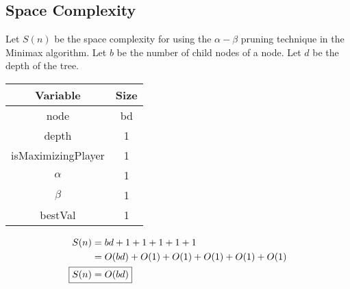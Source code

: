 \documentclass[12pt]{article}%
\begin{document}
  \subsection{Space Complexity \cite{cis}}
    Let $S(n)$ be the space complexity for using the $\alpha - \beta$ pruning technique in the Minimax algorithm. Let $b$ be the number of child nodes of a node. Let $d$ be the depth of the tree. 
    \begin{table}[]
      \centering
      \begin{tabular}{|c|c|}
        \hline
        \textbf{Variable}  & \textbf{Size} \\ \hline
        node               & bd            \\ \hline
        depth              & 1             \\ \hline
        isMaximizingPlayer & 1             \\ \hline
        $\alpha$           & 1             \\ \hline
        $\beta$            & 1             \\ \hline
        bestVal            & 1             \\ \hline
      \end{tabular}
    \end{table}
    \begin{align}
      S(n) &= bd + 1 + 1 + 1 + 1 + 1 \\
      &= O(bd) + O(1) + O(1) + O(1) + O(1) + O(1) \\
      \Aboxed{S(n) &= O(bd)}
    \end{align}
  \newpage

\printbibliography[heading=bibintoc,title={Bibliography}]
\end{document}
